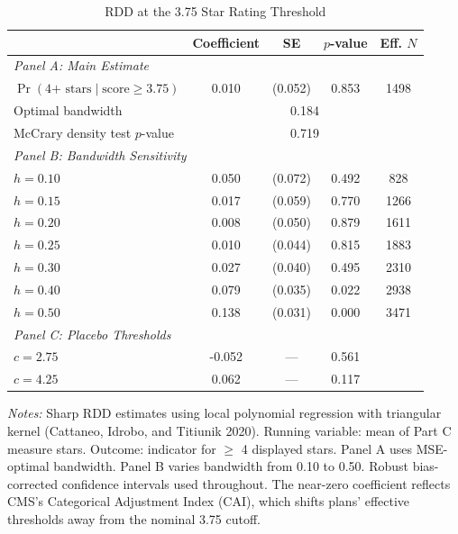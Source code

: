 \begin{table}[t]
\centering
\caption{RDD at the 3.75 Star Rating Threshold}
\label{tab:rdd}
\begin{threeparttable}
\begin{tabular}{lcccc}
\hline\hline
 & Coefficient & SE & $p$-value & Eff. $N$ \\
\hline
\multicolumn{5}{l}{\textit{Panel A: Main Estimate}} \\[3pt]
$\Pr(\text{4+ stars} \mid \text{score} \geq 3.75)$ & 0.010 & (0.052) & 0.853 & 1498 \\
\quad Optimal bandwidth & \multicolumn{4}{c}{0.184} \\
\quad McCrary density test $p$-value & \multicolumn{4}{c}{0.719} \\
\hline
\multicolumn{5}{l}{\textit{Panel B: Bandwidth Sensitivity}} \\[3pt]
\quad $h = 0.10$ & 0.050 & (0.072) & 0.492 & 828 \\
\quad $h = 0.15$ & 0.017 & (0.059) & 0.770 & 1266 \\
\quad $h = 0.20$ & 0.008 & (0.050) & 0.879 & 1611 \\
\quad $h = 0.25$ & 0.010 & (0.044) & 0.815 & 1883 \\
\quad $h = 0.30$ & 0.027 & (0.040) & 0.495 & 2310 \\
\quad $h = 0.40$ & 0.079 & (0.035) & 0.022 & 2938 \\
\quad $h = 0.50$ & 0.138 & (0.031) & 0.000 & 3471 \\
\hline
\multicolumn{5}{l}{\textit{Panel C: Placebo Thresholds}} \\[3pt]
\quad $c = 2.75$ & -0.052 & --- & 0.561 & \\
\quad $c = 4.25$ & 0.062 & --- & 0.117 & \\
\hline\hline
\end{tabular}
\begin{tablenotes}
\item \textit{Notes:} Sharp RDD estimates using local polynomial regression with triangular
kernel (Cattaneo, Idrobo, and Titiunik 2020). Running variable: mean of Part C measure stars.
Outcome: indicator for $\geq$ 4 displayed stars. Panel A uses MSE-optimal bandwidth.
Panel B varies bandwidth from 0.10 to 0.50. Robust bias-corrected confidence intervals
used throughout. The near-zero coefficient reflects CMS's Categorical Adjustment Index
(CAI), which shifts plans' effective thresholds away from the nominal 3.75 cutoff.
\end{tablenotes}
\end{threeparttable}
\end{table}
